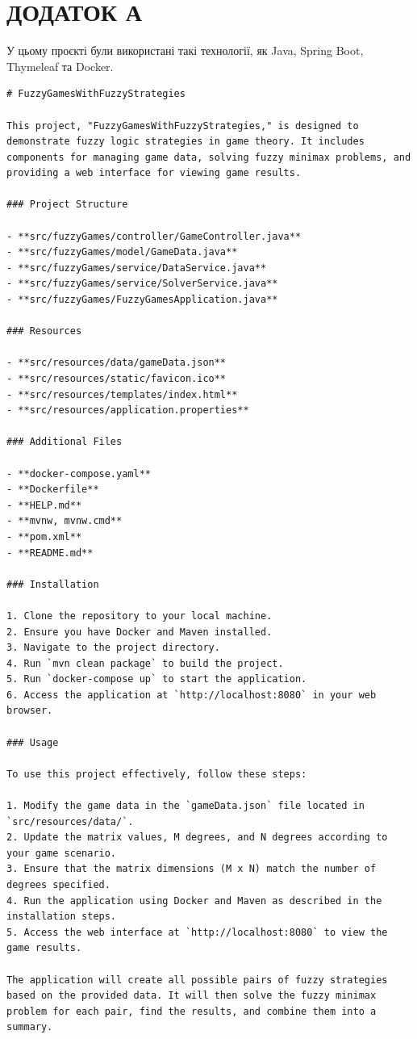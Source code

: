 \documentclass[14pt, a4paper, oneside]{extarticle}
\numberwithin{equation}{section}
\begin{document}

\lstset{language=Java, breaklines=true, breakatwhitespace=true, basicstyle=\small\ttfamily, numbers=left, stepnumber=1, numbersep=10pt, frame=single}


\section*{ДОДАТОК А}
\label{Додаток А}
У цьому проєкті були використані такі технології, як Java, Spring Boot, Thymeleaf та Docker.

\begin{lstlisting}[caption=README.md]
# FuzzyGamesWithFuzzyStrategies

This project, "FuzzyGamesWithFuzzyStrategies," is designed to demonstrate fuzzy logic strategies in game theory. It includes components for managing game data, solving fuzzy minimax problems, and providing a web interface for viewing game results.

### Project Structure

- **src/fuzzyGames/controller/GameController.java**
- **src/fuzzyGames/model/GameData.java**
- **src/fuzzyGames/service/DataService.java**
- **src/fuzzyGames/service/SolverService.java**
- **src/fuzzyGames/FuzzyGamesApplication.java**

### Resources

- **src/resources/data/gameData.json**
- **src/resources/static/favicon.ico**
- **src/resources/templates/index.html**
- **src/resources/application.properties**

### Additional Files

- **docker-compose.yaml**
- **Dockerfile**
- **HELP.md**
- **mvnw, mvnw.cmd**
- **pom.xml**
- **README.md**

### Installation

1. Clone the repository to your local machine.
2. Ensure you have Docker and Maven installed.
3. Navigate to the project directory.
4. Run `mvn clean package` to build the project.
5. Run `docker-compose up` to start the application.
6. Access the application at `http://localhost:8080` in your web browser.

### Usage

To use this project effectively, follow these steps:

1. Modify the game data in the `gameData.json` file located in `src/resources/data/`.
2. Update the matrix values, M degrees, and N degrees according to your game scenario.
3. Ensure that the matrix dimensions (M x N) match the number of degrees specified.
4. Run the application using Docker and Maven as described in the installation steps.
5. Access the web interface at `http://localhost:8080` to view the game results.

The application will create all possible pairs of fuzzy strategies based on the provided data. It will then solve the fuzzy minimax problem for each pair, find the results, and combine them into a summary.
\end{lstlisting}
\end{document}
